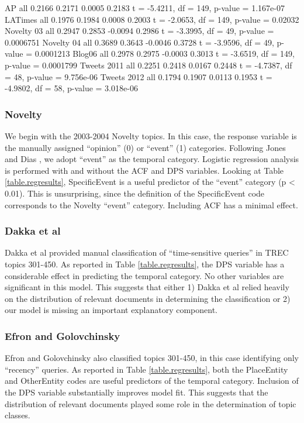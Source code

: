 \documentclass{sig-alternate}
\begin{document}
AP 
	all	0.2166	0.2171	0.0005		0.2183
	t = -5.4211, df = 149, p-value = 1.167e-07	
LATimes
	all	0.1976	0.1984	0.0008		0.2003
	t = -2.0653, df = 149, p-value = 0.02032	
Novelty 03
	all	0.2947	0.2853	-0.0094		0.2986
	t = -3.3995, df = 49, p-value = 0.0006751
Novelty 04
	all	0.3689	0.3643	-0.0046		0.3728
	t = -3.9596, df = 49, p-value = 0.0001213	
Blog06
	all	0.2978	0.2975	-0.0003		0.3013
	t = -3.6519, df = 149, p-value = 0.0001799		
Tweets 2011
	all	0.2251	0.2418	0.0167		0.2448
	t = -4.7387, df = 48, p-value = 9.756e-06	
Tweets 2012
	all	0.1794	0.1907	0.0113		0.1953
	t = -4.9802, df = 58, p-value = 3.018e-06	
	
\subsubsection{Novelty}

We begin with the 2003-2004 Novelty topics. In this case, the response variable is the manually assigned ``opinion'' (0) or ``event'' (1) categories. Following Jones and Dias \cite{Jones2007}, we adopt ``event'' as the temporal category. Logistic regression analysis is performed with and without the ACF and DPS variables. Looking at Table \ref{table.regresults}, SpecificEvent is a useful predictor of the ``event'' category (p < 0.01). This is unsurprising, since the definition of the SpecificEvent code corresponds to the Novelty ``event'' category. Including ACF has a minimal effect. 

\subsubsection{Dakka et al}

Dakka et al provided manual classification of ``time-sensitive queries'' in TREC topics 301-450. As reported in Table \ref{table.regresults}, the DPS variable has a considerable effect in predicting the temporal category. No other variables are significant in this model. This suggests that either 1) Dakka et al relied heavily on the distribution of relevant documents in determining the classification or 2) our model is missing an important explanatory component.

\subsubsection{Efron and Golovchinsky}

Efron and Golovchinsky also classified topics 301-450, in this case identifying only ``recency'' queries. As reported in Table \ref{table.regresults}, both the PlaceEntity and OtherEntity codes are useful predictors of the temporal category. Inclusion of the DPS variable substantially improves model fit. This suggests that the distribution of relevant documents played some role in the determination of topic classes.
\end{document}
